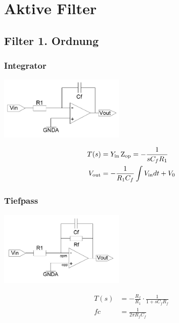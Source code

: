 \section{Aktive Filter}

\subsection{Filter 1. Ordnung}

\subsubsection{Integrator}
\begin{multicols}{2}
	\begin{center}
		\includegraphics[width=6cm]{images/filter_1_integrator.jpg}
	\end{center}
	\begin{align*}
		T(s) &= Y_{\operatorname{\text{in}}} \operatorname{Z_{\text{op}}} = - \frac{1}{s C_f R_1} \\
		V_{\operatorname{\text{out}}} &= -\frac{1}{R_1 C_f} \int V_{\operatorname{\text{in}}} dt + V_0
	\end{align*}
\end{multicols}

\subsubsection{Tiefpass}
\begin{multicols}{2}
	\begin{center}
		\includegraphics[width=6cm]{images/filter_1_tiefpass.jpg}
	\end{center}
	\begin{align*}
		T(s) &= -\frac{R_f}{R_1} \cdot \frac{1}{1 + s C_f R_f} \\
		fc &= \frac{1}{2 \pi R_f C_f}
	\end{align*}
\end{multicols}

